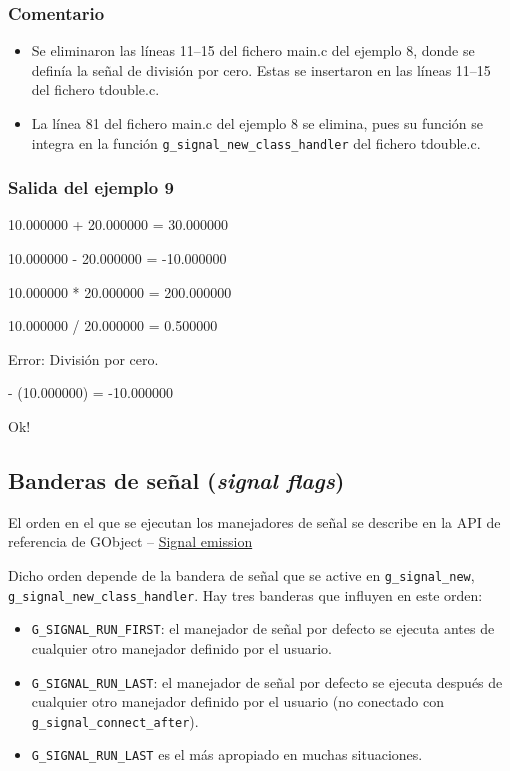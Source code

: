 \subsubsection{Comentario}
\begin{itemize}
\item Se eliminaron las líneas 11--15 del fichero \textsf{main.c} del ejemplo 8,
  donde se definía la señal de división por cero. Estas se insertaron en
  las líneas 11--15 del fichero \textsf{tdouble.c}.
\item La línea 81 del fichero \textsf{main.c} del ejemplo 8 se elimina, pues su
  función se integra en la función \texttt{g\_signal\_new\_class\_handler} del
  fichero \textsf{tdouble.c}.
\end{itemize}

\subsubsection{Salida del ejemplo 9}
10.000000 + 20.000000 = 30.000000\par
10.000000 - 20.000000 = -10.000000\par
10.000000 * 20.000000 = 200.000000\par
10.000000 / 20.000000 = 0.500000\par
\vspace{1ex}
Error: División por cero.\par
\vspace{1ex}
- (10.000000) = -10.000000\par
Ok!\par

\subsection{Banderas de señal (\emph{signal flags})}
El orden en el que se ejecutan los manejadores de señal se describe en la API de
referencia de GObject -- 
\href{https://docs.gtk.org/gobject/concepts.html#signal-emission}{Signal emission}

Dicho orden depende de la bandera de señal que se active en \texttt{g\_signal\_new},
\texttt{g\_signal\_new\_class\_handler}.
Hay tres banderas que influyen en este orden:
\vspace{-\topsep}
\begin{itemize}
  \tightlist
\item \texttt{G\_SIGNAL\_RUN\_FIRST}: el manejador de señal por defecto se ejecuta antes de cualquier otro manejador definido por el usuario.
\item \texttt{G\_SIGNAL\_RUN\_LAST}: el manejador de señal por defecto se ejecuta después de cualquier otro manejador definido por el usuario (no conectado con
  \texttt{g\_signal\_connect\_after}).
\item \texttt{G\_SIGNAL\_RUN\_LAST} es el más apropiado en muchas situaciones.
\end{itemize}

